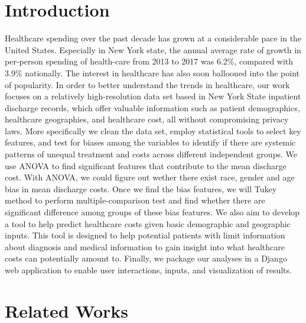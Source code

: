\documentclass[10pt,twocolumn,letterpaper]{article}
\begin{document}
\section{Introduction}

Healthcare spending over the past decade has grown at a considerable pace in the United States. Especially in New York state, the annual average rate of growth in per-person spending of health-care from 2013 to 2017 was 6.2\%, compared with 3.9\% nationally. The interest in healthcare has also soon ballooned into the point of popularity. In order to better understand the trends in healthcare, our work focuses on a relatively high-resolution data set based in New York State inpatient discharge records, which offer valuable information such as patient demographics, healthcare geographies, and healthcare cost, all without compromising privacy laws. More specifically we clean the data set, employ statistical tools to select key features, and test for biases among the variables to identify if there are systemic patterns of unequal treatment and costs across different independent groups. We use ANOVA to find significant features that contribute to the mean discharge cost. With ANOVA, we could figure out wether there exist race, gender and age bias in mean discharge costs. Once we find the bias features, we will Tukey method to perform multiple-comparison test and find whether there are significant difference among groups of these bias features. We also aim to develop a tool to help predict healthcare costs given basic demographic and geographic inputs. This tool is designed to help potential patients with limit information about diagnosis and medical information to gain insight into what healthcare costs can potentially amount to. Finally, we package our analyses in a Django web application to enable user interactions, inputs, and visualization of results. %



\section{Related Works}
\end{document}
